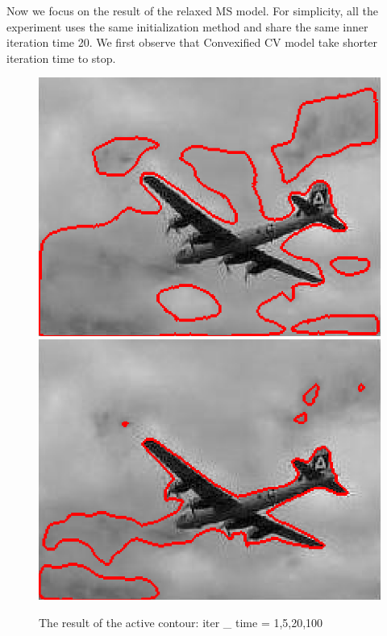 \documentclass{article}
\begin{document}
Now we focus on the result of the relaxed MS model. For simplicity, all the experiment uses the same initialization method and share the same inner iteration time 20. We first observe that Convexified CV model take shorter iteration time to stop. 

\begin{figure}[H]
\caption{The result of the active contour: iter \_ time = 1,5,20,100}
\begin{center}
\includegraphics[scale=.23]{cv1.png}
\includegraphics[scale=.23]{cv5.png}

\end{center}
\end{figure}
\end{document}
